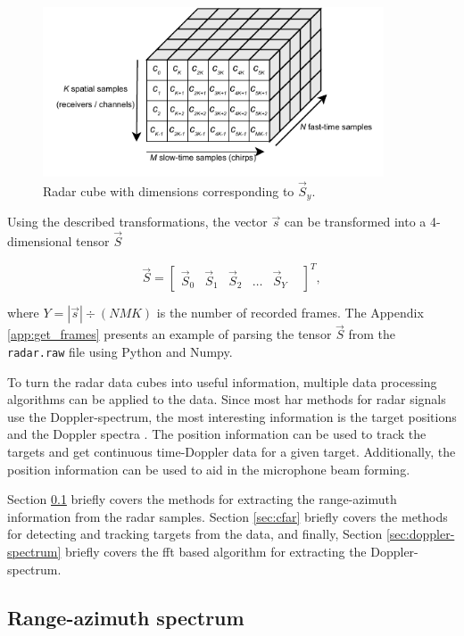 \begin{figure}
    \centering
    \includegraphics[width=0.9\textwidth]{fig/4/radar-cube.pdf}
    \caption{Radar cube with dimensions corresponding to $\vec{S}_y$.}
    \label{fig:radar-cube}
\end{figure}

Using the described transformations, the vector $\vec{s}$ can be transformed into a 4-dimensional tensor $\vec{S}$

\begin{equation}
    \vec{S} = \begin{bmatrix} \vec{S}_0 & \vec{S}_1 & \vec{S}_2 & \ldots & \vec{S}_Y & \end{bmatrix}^T,
\end{equation}

where $Y = | \vec{s} | \div (NMK)$ is the number of recorded frames.
The Appendix \ref{app:get_frames} presents an example of parsing the tensor $\vec{S}$ from the \texttt{radar.raw} file using Python and Numpy.

To turn the radar data cubes into useful information,
multiple data processing algorithms can be applied to the data.
Since most \gls{har} methods for radar signals use the Doppler-spectrum,
the most interesting information is the target positions and the Doppler spectra \cite{sensing-survey}.
The position information can be used to track the targets and get continuous time-Doppler data for a given target.
Additionally, the position information can be used to aid in the microphone beam forming.

Section \ref{sec:range-angle} briefly covers the methods for extracting the range-azimuth information from the radar samples.
Section \ref{sec:cfar} briefly covers the methods for detecting and tracking targets from the data,
and finally, Section \ref{sec:doppler-spectrum} briefly covers the \gls{fft} based algorithm for extracting the Doppler-spectrum.

\subsection{Range-azimuth spectrum}
\label{sec:range-angle}

